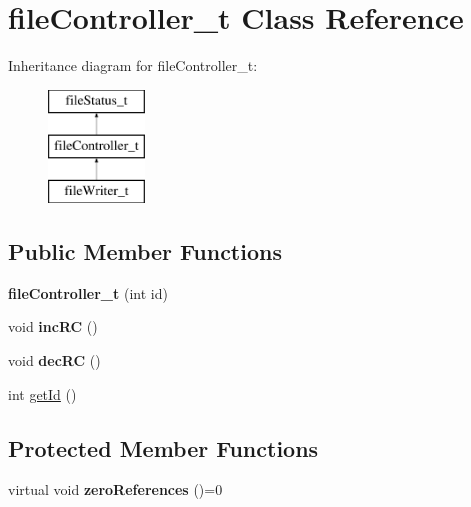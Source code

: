 \hypertarget{classfileController__t}{\section{file\-Controller\-\_\-t \-Class \-Reference}
\label{classfileController__t}
}
\-Inheritance diagram for file\-Controller\-\_\-t\-:\begin{figure}[H]
\begin{center}
\leavevmode
\includegraphics[height=3.000000cm]{classfileController__t}
\end{center}
\end{figure}
\subsection*{\-Public \-Member \-Functions}
\begin{DoxyCompactItemize}
\item 
\hypertarget{classfileController__t_a0149daa475caff199b9446972d423a93}{{\bfseries file\-Controller\-\_\-t} (int id)}\label{classfileController__t_a0149daa475caff199b9446972d423a93}

\item 
\hypertarget{classfileController__t_a85b6edc65a5c9718969f1e6a889eb862}{void {\bfseries inc\-R\-C} ()}\label{classfileController__t_a85b6edc65a5c9718969f1e6a889eb862}

\item 
\hypertarget{classfileController__t_a07ac972c73cdc8e48cec609d473c2c41}{void {\bfseries dec\-R\-C} ()}\label{classfileController__t_a07ac972c73cdc8e48cec609d473c2c41}

\item 
int \hyperlink{classfileController__t_a936c41656db43817615ae592d9b086c6}{get\-Id} ()
\end{DoxyCompactItemize}
\subsection*{\-Protected \-Member \-Functions}
\begin{DoxyCompactItemize}
\item 
\hypertarget{classfileController__t_abe5a846a0f83f2a467966080dca242d7}{virtual void {\bfseries zero\-References} ()=0}\label{classfileController__t_abe5a846a0f83f2a467966080dca242d7}

\end{DoxyCompactItemize}



